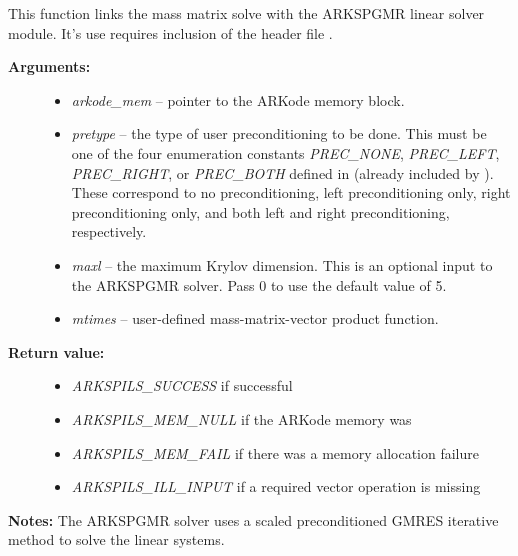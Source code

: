 \documentclass[letterpaper,10pt,english]{sphinxmanual}
\begin{document}

\begin{fulllineitems}
\label{c_interface/User_callable:ARKMassSpgmr}
This function links the mass matrix solve with the ARKSPGMR linear
solver module.  It's use requires inclusion of the header file
.
\begin{description}
\item[{\textbf{Arguments:}}] \leavevmode\begin{itemize}
\item {} 
\emph{arkode\_mem} -- pointer to the ARKode memory block.

\item {} 
\emph{pretype} -- the type of user preconditioning to be done.  This
must be one of the four enumeration constants \emph{PREC\_NONE},
\emph{PREC\_LEFT}, \emph{PREC\_RIGHT}, or \emph{PREC\_BOTH} defined in
 (already included by
). These correspond to no preconditioning,
left preconditioning only, right preconditioning only, and
both left and right preconditioning, respectively.

\item {} 
\emph{maxl} -- the maximum Krylov dimension. This is an optional input
to the ARKSPGMR solver. Pass 0 to use the default value of 5.

\item {} 
\emph{mtimes} -- user-defined mass-matrix-vector product function.

\end{itemize}

\item[{\textbf{Return value:}}] \leavevmode\begin{itemize}
\item {} 
\emph{ARKSPILS\_SUCCESS} if successful

\item {} 
\emph{ARKSPILS\_MEM\_NULL}  if the ARKode memory was 

\item {} 
\emph{ARKSPILS\_MEM\_FAIL}  if there was a memory allocation failure

\item {} 
\emph{ARKSPILS\_ILL\_INPUT} if a required vector operation is missing

\end{itemize}

\end{description}

\textbf{Notes:} The ARKSPGMR solver uses a scaled preconditioned GMRES
iterative method to solve the linear systems.

\end{fulllineitems}
\end{document}
